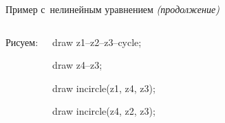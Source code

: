 \begin{frame}{Пример с~нелинейным уравнением {\mdseries\itshape(продолжение)}}
\begin{columns}
Рисуем:
\begin{programlisting}
draw z1--z2--z3--cycle;\par
draw z4--z3;\par
draw incircle(z1, z4, z3);\par
draw incircle(z4, z2, z3);\par
\end{programlisting}
\centerline{}
\end{columns}
\end{frame}

